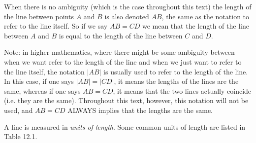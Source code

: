       \label{m39370*id313175}When there is no ambiguity (which is the case throughout this text) the length of the line between points $A$ and \begin{math}B\end{math} is also denoted \begin{math}AB\end{math}\hspace{1ex}, the same as the notation to refer to the line itself. So if we say \begin{math}AB=CD\end{math}\hspace{1ex} we mean that the length of the line between \begin{math}A\end{math} and \begin{math}B\end{math} is equal to the length of the line between \begin{math}C\end{math} and \begin{math}D\end{math}.
\par 
      \label{m39370*eip-313}Note: in higher mathematics, where there might be some ambiguity between when we want refer to the length of the line and when we just want to refer to the line itself, the notation $|AB|$\hspace{1ex} is usually used to refer to the length of the line. In this case, if one says \begin{math}|AB|=|CD|\end{math}, it means the lengths of the lines are the same, whereas if one says \begin{math}AB=CD\end{math}, it means that the two lines actually coincide (i.e. they are the same). Throughout this text, however, this notation will not be used, and \begin{math}AB=CD\end{math} ALWAYS implies that the lengths are the same. \par \label{m39370*id314000}A line is measured in \textsl{units of length}. Some common units of length are listed in Table 12.1.\par 
